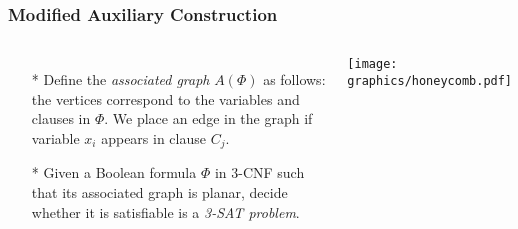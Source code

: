 \documentclass{beamer}
\begin{document}
\begin{frame} \frametitle{Modified Auxiliary Construction}
    \begin{columns}[c]
        \begin{itemize}
            \item[*] Define the \textit{associated graph} $A(\Phi)$ as follows: the vertices correspond to the variables and clauses in $\Phi$.   
We place an edge in the graph if variable $x_i$ appears in clause $C_j$.
            \item[*] Given a Boolean formula $\Phi$ in 3-CNF such that its associated graph is planar, decide whether it 
is satisfiable is a \textit{3-SAT problem}.
        \end{itemize}
        \begin{minipage}{\linewidth}
            \begin{center}
            \texttt{[image: graphics/honeycomb.pdf]}
            \end{center}
        \end{minipage}
    \end{columns}
\end{frame}
\end{document}
